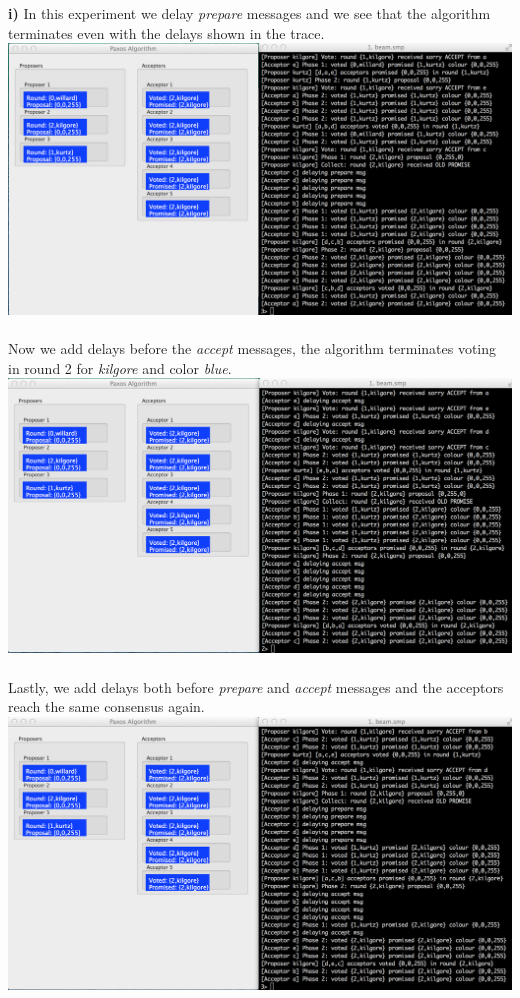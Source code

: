 \documentclass[a4paper, 11pt]{article}
\begin{document}
\textbf{i)} In this experiment we delay \textit{prepare} messages and we see that the algorithm terminates even with the delays shown in the trace.\\
\includegraphics[scale=0.35]{images/exp1.png} \\\\
\newpage
Now we add delays before the \textit{accept} messages, the algorithm terminates voting in round 2 for \textit{kilgore} and color \textit{blue}.\\
\includegraphics[scale=0.35]{images/exp2.png} \\\\
Lastly, we add delays both before \textit{prepare} and \textit{accept} messages and the acceptors reach the same consensus again.\\
\includegraphics[scale=0.35]{images/exp3.png} \\\\
\end{document}
